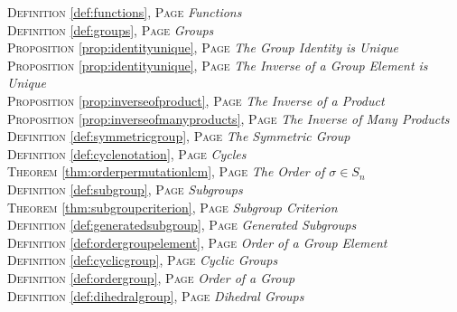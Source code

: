 
\begin{multicols}{2}
      \setlength{\parindent}{0pt}
      \footnotesize{

\textsc{Definition} \ref{def:functions}, \textsc{Page} \pageref{def:functions} \textit{Functions} \\
\textsc{Definition} \ref{def:groups}, \textsc{Page} \pageref{def:groups} \textit{Groups} \\
\textsc{Proposition} \ref{prop:identityunique}, \textsc{Page} \pageref{prop:identityunique} \textit{The Group Identity is Unique} \\
\textsc{Proposition} \ref{prop:identityunique}, \textsc{Page} \pageref{prop:identityunique} \textit{The Inverse of a Group Element is Unique} \\
\textsc{Proposition} \ref{prop:inverseofproduct}, \textsc{Page} \pageref{prop:inverseofproduct} \textit{The Inverse of a Product} \\
\textsc{Proposition} \ref{prop:inverseofmanyproducts}, \textsc{Page} \pageref{prop:inverseofmanyproducts} \textit{The Inverse of Many Products} \\
\textsc{Definition} \ref{def:symmetricgroup}, \textsc{Page} \pageref{def:symmetricgroup} \textit{The Symmetric Group} \\
\textsc{Definition} \ref{def:cyclenotation}, \textsc{Page} \pageref{def:cyclenotation} \textit{Cycles} \\
\textsc{Theorem} \ref{thm:orderpermutationlcm}, \textsc{Page} \pageref{thm:orderpermutationlcm} \textit{The Order of \(\sigma \in S_n\)} \\
\textsc{Definition} \ref{def:subgroup}, \textsc{Page} \pageref{def:subgroup} \textit{Subgroups} \\
\textsc{Theorem} \ref{thm:subgroupcriterion}, \textsc{Page} \pageref{thm:subgroupcriterion} \textit{Subgroup Criterion} \\
\textsc{Definition} \ref{def:generatedsubgroup}, \textsc{Page} \pageref{def:generatedsubgroup} \textit{Generated Subgroups} \\
\textsc{Definition} \ref{def:ordergroupelement}, \textsc{Page} \pageref{def:ordergroupelement} \textit{Order of a Group Element} \\
\textsc{Definition} \ref{def:cyclicgroup}, \textsc{Page} \pageref{def:cyclicgroup} \textit{Cyclic Groups} \\
\textsc{Definition} \ref{def:ordergroup}, \textsc{Page} \pageref{def:ordergroup} \textit{Order of a Group} \\
\textsc{Definition} \ref{def:dihedralgroup}, \textsc{Page} \pageref{def:dihedralgroup} \textit{Dihedral Groups} \\
}
\end{multicols}
